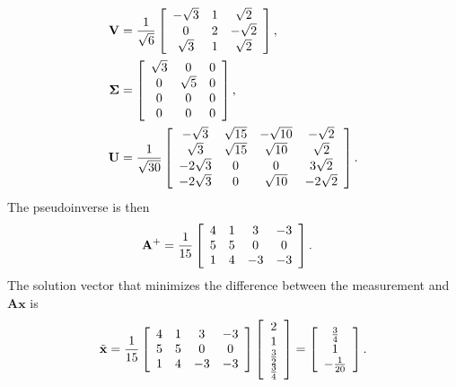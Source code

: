 \begin{subequations}
\begin{align}
  \mathbf{V} &= \frac{1}{\sqrt{6}} \left[ \begin{array}{c c c}
  -\sqrt{3} 	&  1			&  \sqrt{2}			\\
   0			&  2			& -\sqrt{2}			\\
   \sqrt{3}		&  1			&  \sqrt{2}			\\ \end{array} \right] , \\
   \boldsymbol\Sigma &= \left[ \begin{array}{c c c}
   \sqrt{3}		&  0			&  0				\\
   0			&  \sqrt{5}		&  0				\\
   0			&  0			&  0				\\
   0			&  0			&  0				\\ \end{array} \right] , \\
  \mathbf{U} &= \frac{1}{\sqrt{30}} \left[ \begin{array}{c c c c} 
  -\sqrt{3}		&  \sqrt{15}	& -\sqrt{10}		& -\sqrt{2}				\\
   \sqrt{3}		&  \sqrt{15}	&  \sqrt{10}		&  \sqrt{2}				\\
  -2 \sqrt{3}	&  0			&  0				&  3 \sqrt{2}			\\
  -2 \sqrt{3}	&  0			&  \sqrt{10}		& -2 \sqrt{2}			\\ \end{array} \right] . 
\end{align}
\end{subequations} 
The pseudoinverse is then
\begin{align}
  \mathbf{A}^+ &= \frac{1}{15} \left[ \begin{array}{c c c c}
   4		&  1		&  3		& -3		\\
   5		&  5		&  0		&  0		\\
   1		&  4		& -3		& -3		\\ \end{array} \right] .
\end{align}
The solution vector that minimizes the difference between the measurement and $\mathbf{Ax}$ is
\begin{align}
  \tilde{\mathbf{x}} = 
  \frac{1}{15} \left[ \begin{array}{c c c c}
   4		&  1		&  3		& -3		\\
   5		&  5		&  0		&  0		\\
   1		&  4		& -3		& -3		\\ \end{array} \right]
   \left[ \begin{array}{c} 2 \\ 1 \\ \frac{3}{2} \\ \frac{3}{4} \\ \end{array} \right] =
   \left[ \begin{array}{c} \frac{3}{4} \\ 1 \\ -\frac{1}{20} \\ \end{array} \right] .
\end{align}

